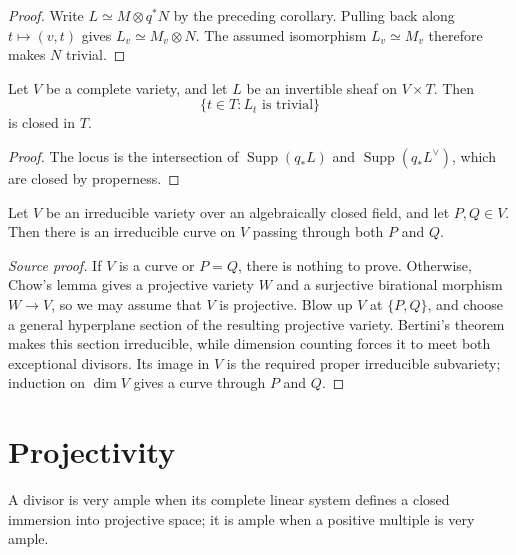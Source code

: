 \begin{proof}
Write $L\simeq M\otimes q^*N$ by the preceding corollary.  Pulling back along
$t\mapsto(v,t)$ gives $L_v\simeq M_v\otimes N$.  The assumed isomorphism
$L_v\simeq M_v$ therefore makes $N$ trivial.
\end{proof}

\begin{proposition}
\label{prop:milne-seesaw-closed-locus}

Let $V$ be a complete variety, and let $L$ be an invertible sheaf on
$V\times T$.  Then
\[
\{t\in T:L_t\text{ is trivial}\}
\]
is closed in $T$.
\end{proposition}

\begin{proof}
The locus is the intersection of $\operatorname{Supp}(q_*L)$ and
$\operatorname{Supp}(q_*L^\vee)$, which are closed by properness.
\end{proof}

\begin{lemma}
\label{lem:milne-curve-through-two-points}

Let $V$ be an irreducible variety over an algebraically closed field, and let
$P,Q\in V$.  Then there is an irreducible curve on $V$ passing through both
$P$ and $Q$.
\end{lemma}

\begin{proof}[Source proof]
If $V$ is a curve or $P=Q$, there is nothing to prove.  Otherwise, Chow's
lemma gives a projective variety $W$ and a surjective birational morphism
$W\to V$, so we may assume that $V$ is projective.  Blow up $V$ at
$\{P,Q\}$, and choose a general hyperplane section of the resulting
projective variety.  Bertini's theorem makes this section irreducible, while
dimension counting forces it to meet both exceptional divisors.  Its image in
$V$ is the required proper irreducible subvariety; induction on $\dim V$
gives a curve through $P$ and $Q$.
\end{proof}

\section{Projectivity}

\begin{definition}
\label{def:milne-very-ample}

A divisor is very ample when its complete linear system defines a closed
immersion into projective space; it is ample when a positive multiple is very
ample.
\end{definition}

